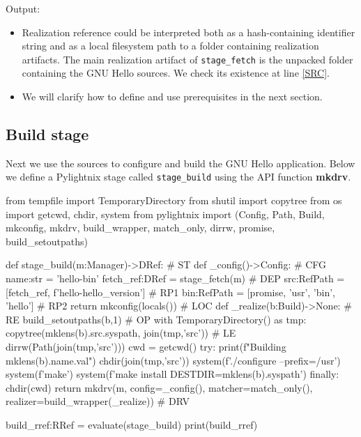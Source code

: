 \documentclass{article}
\begin{document}
Output:

\mysmallstdout

\begin{itemize}
  \item Realization reference could be interpreted both as a
    hash-containing identifier string and as a local filesystem path to a
    folder containing realization artifacts. The main realization artifact
    of \texttt{stage\_fetch} is the unpacked folder containing the GNU
    Hello sources. We check its existence at line \ref{SRC}.
  \item We will clarify how to define and use prerequisites in the next
    section.
\end{itemize}

\pagebreak

\subsection{Build stage}

Next we use the sources to configure and build the GNU Hello
application. Below we define a Pylightnix stage called
\texttt{stage\_build} using the API function \textbf{mkdrv}.

\begin{pythontexcode}
from tempfile import TemporaryDirectory
from shutil import copytree
from os import getcwd, chdir, system
from pylightnix import (Config, Path, Build, mkconfig, mkdrv,
  build_wrapper, match_only, dirrw, promise, build_setoutpaths)

def stage_build(m:Manager)->DRef:                            # ST \label{ST}
  def _config()->Config:                                     # CFG \label{CFG}
    name:str = 'hello-bin'
    fetch_ref:DRef = stage_fetch(m)                          # DEP \label{DEP}
    src:RefPath = [fetch_ref, f'hello-{hello_version}']      # RP1 \label{RP1}
    bin:RefPath = [promise, 'usr', 'bin', 'hello']           # RP2 \label{RP2}
    return mkconfig(locals())                                # LOC \label{LOC}
  def _realize(b:Build)->None:                               # RE \label{RE}
    build_setoutpaths(b,1)                                   # OP \label{OP}
    with TemporaryDirectory() as tmp:
      copytree(mklens(b).src.syspath, join(tmp,'src'))       # LE \label{LE}
      dirrw(Path(join(tmp,'src')))
      cwd = getcwd()
      try:
        print(f"Building {mklens(b).name.val}")
        chdir(join(tmp,'src'))
        system(f'./configure --prefix=/usr')
        system(f'make')
        system(f'make install DESTDIR={mklens(b).syspath}')
      finally:
        chdir(cwd)
  return mkdrv(m, config=_config(),
                  matcher=match_only(),
                  realizer=build_wrapper(_realize))          # DRV \label{DRV}

build_rref:RRef = evaluate(stage_build)
print(build_rref)
\end{pythontexcode}
\end{document}
